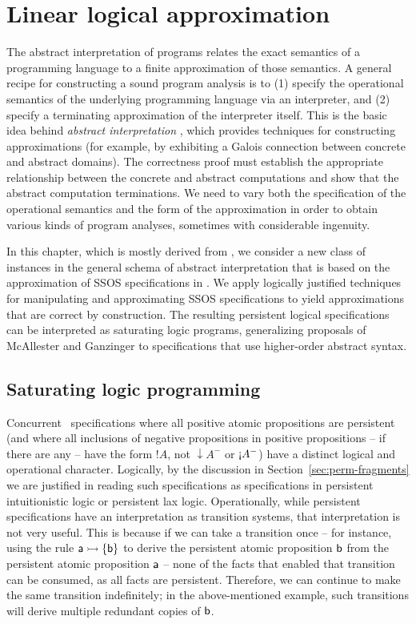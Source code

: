 \chapter{Linear logical approximation}
\label{chapter-approx}

The abstract interpretation of programs relates the exact semantics of
a programming language to a finite approximation of those semantics. A
general recipe for constructing a sound program analysis is to (1)
specify the operational semantics of the underlying programming
language via an interpreter, and (2) specify a terminating
approximation of the interpreter itself. This is the basic idea behind
{\it abstract interpretation} \cite{cousot77abstract}, which provides
techniques for constructing approximations (for example, by exhibiting
a Galois connection between concrete and abstract domains). The
correctness proof must establish the appropriate relationship between
the concrete and abstract computations and show that the abstract
computation terminations. We need to vary both the specification of
the operational semantics and the form of the approximation in order
to obtain various kinds of program analyses, sometimes with
considerable ingenuity.

In this chapter, which is mostly derived from \cite{simmons11logical},
we consider a new class of instances in the general schema of abstract
interpretation that is based on the approximation of SSOS
specifications in \sls. We apply logically justified techniques for
manipulating and approximating SSOS specifications to yield
approximations that are correct by construction. The resulting
persistent logical specifications can be interpreted as saturating
logic programs, generalizing proposals of McAllester and Ganzinger
\cite{mcallester02complexity,ganzinger02logical} to specifications
that use higher-order abstract syntax.

\section{Saturating logic programming}

Concurrent \sls~specifications where all positive atomic propositions
are persistent (and where all inclusions of negative propositions in
positive propositions -- if there are any -- have the form ${!}A$, not
${\downarrow}A^-$ or ${\gnab}A^-$) have a distinct logical and
operational character. Logically, by the discussion in
Section~\ref{sec:perm-fragments} we are justified in reading such
specifications as specifications in persistent intuitionistic logic or
persistent lax logic. Operationally, while persistent specifications
have an interpretation as transition systems, that interpretation is
not very useful. This is because if we can take a transition once --
for instance, using the rule ${\sf a} \rightarrowtail \{ {\sf b} \}$ to derive
the persistent atomic proposition ${\sf b}$ from the persistent atomic
proposition ${\sf a}$ -- none of the facts that enabled that
transition can be consumed, as all facts are persistent. Therefore, we
can continue to make the same transition indefinitely; in the
above-mentioned example, such transitions will derive multiple
redundant copies of ${\sf b}$.

